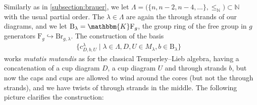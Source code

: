 \documentclass[a4paper,11pt]{amsart}
\newcommand{\muta}{\textsl{mutatis mutandis}}
\renewcommand{\dots}{\text{...}}
\newcommand{\setstuff}[1]{\mathrm{#1}}
\newcommand{\KK}{\mathbbm{K}}
\newcommand{\N}{\mathbb{N}}
\numberwithin{equation}{section}
\let\fullref\autoref
\begin{document}
Similarly as in \fullref{subsection:brauer}, 
we let $\Lambda=\big(\{n,n-2,n-4,\dots\},\leq_{\N}\big)\subset\N$ 
with the usual partial order.
The $\lambda\in\Lambda$ are again the through strands of our diagrams, 
and we let $\setstuff{B}_{\lambda}=\KK\setstuff{F}_{g}$, 
the group ring of the free group in $g$ 
generators $\setstuff{F}_{g}\hookrightarrow\setstuff{Br}_{g,\lambda}$.
The construction of the basis 
\begin{gather}\label{eq:tl-basis}
\{c_{D,b,U}^{\lambda}\mid\lambda\in\Lambda,D,U\in M_{\lambda},
b\in\setstuff{B}_{\lambda}\}
\end{gather} 
works {\muta} as for the 
classical Temperley--Lieb algebra, having a concatenation 
of a cup diagram $D$, a cup diagram $U$ and through strands $b$, but now 
the caps and cups are allowed to wind around the cores 
(but not the through strands), 
and we have twists of through strands in the middle.
The following picture clarifies the construction:
\end{document}
